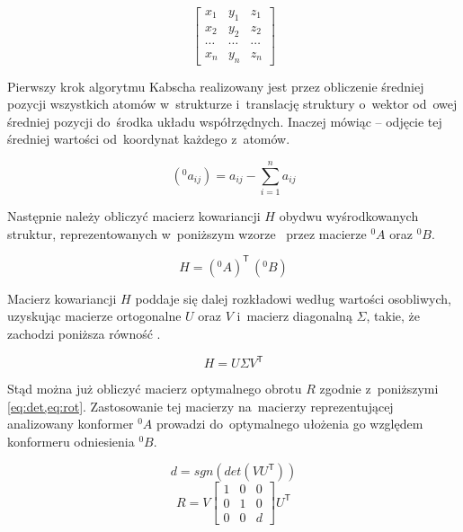 \begin{equation}
  \begin{bmatrix}
    x_1 & y_1 & z_1\\
    x_2 & y_2 & z_2\\
    \cdots & \cdots & \cdots \\
    x_n & y_n & z_n
  \end{bmatrix}
\end{equation}

Pierwszy krok algorytmu Kabscha realizowany jest przez obliczenie średniej pozycji
  wszystkich atomów w~strukturze i~translację struktury o~wektor od~owej średniej pozycji
  do~środka układu współrzędnych.
Inaczej mówiąc \--- odjęcie tej średniej wartości od~koordynat każdego z~atomów.

\begin{equation}
  (^0a_{ij}) = a_{ij} - \sum\limits^n_{i=1}a_{ij}
\end{equation}

Następnie należy obliczyć macierz kowariancji $H$ obydwu wyśrodkowanych struktur,
  reprezentowanych w~poniższym wzorze~ przez macierze $^0\!A$ oraz $^0B$.

\begin{equation}\label{eq:cov}
  H = (^0\!A)^\mathsf{T}\,(^0B)
\end{equation}

Macierz kowariancji $H$ poddaje się dalej rozkładowi według wartości osobliwych, uzyskując
  macierze ortogonalne $U$ oraz $V$ i~macierz diagonalną $\varSigma$, takie, że zachodzi
  poniższa równość .

\begin{equation}\label{eq:svd}
  H = U\varSigma{}V^\mathsf{T}
\end{equation}

Stąd można już obliczyć macierz optymalnego obrotu $R$ zgodnie z~poniższymi \cref{eq:det,eq:rot}.
Zastosowanie tej macierzy na~macierzy reprezentującej analizowany konformer $^0\!A$ prowadzi
  do~optymalnego ułożenia go względem konformeru odniesienia $^0B$.

\begin{equation}\label{eq:det}
  d = sgn(det(VU^\mathsf{T}))
\end{equation}
\begin{equation}\label{eq:rot}
  R = V \begin{bmatrix}
    1 & 0 & 0 \\
    0 & 1 & 0 \\
    0 & 0 & d
  \end{bmatrix} U^\mathsf{T}
\end{equation}

